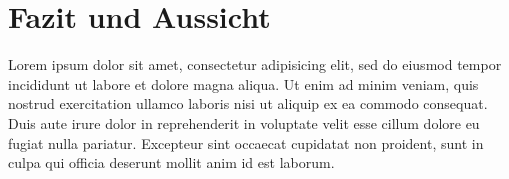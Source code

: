 \section{Fazit und Aussicht} %
\label{sec:fazit_und_aussicht}

	Lorem ipsum dolor sit amet, consectetur adipisicing elit, sed do eiusmod
	tempor incididunt ut labore et dolore magna aliqua. Ut enim ad minim veniam,
	quis nostrud exercitation ullamco laboris nisi ut aliquip ex ea commodo
	consequat. Duis aute irure dolor in reprehenderit in voluptate velit esse
	cillum dolore eu fugiat nulla pariatur. Excepteur sint occaecat cupidatat non
	proident, sunt in culpa qui officia deserunt mollit anim id est laborum.

